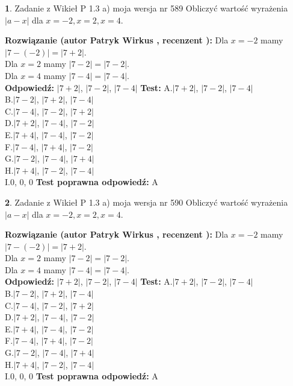 \documentclass[12pt, a4paper]{article}
\theoremstyle{definition} %
\newtheorem{zad}{}
\newcommand{\zadStart}[1]{\begin{zad}#1\newline}
\newcommand{\zadStop}{\end{zad}}
\newcommand{\rozwStart}[2]{\noindent \textbf{Rozwiązanie (autor #1 , recenzent #2): }\newline}
\newcommand{\rozwStop}{\newline}
\newcommand{\odpStart}{\noindent \textbf{Odpowiedź:}\newline}
\newcommand{\odpStop}{\newline}
\newcommand{\testStart}{\noindent \textbf{Test:}\newline}
\newcommand{\testStop}{\newline}
\newcommand{\kluczStart}{\noindent \textbf{Test poprawna odpowiedź:}\newline}
\newcommand{\kluczStop}{\newline}
\begin{document}
\zadStart{Zadanie z Wikieł P 1.3 a) moja wersja nr 589}
Obliczyć wartość wyrażenia $|a - x|$ dla $x=-2,x=2,x=4$.
\zadStop
\rozwStart{Patryk Wirkus}{}
Dla $x = -2$ mamy $|7 - (-2)| = |7 + 2|$.\\
Dla $x = 2$ mamy $|7 - 2| = |7 - 2|$.\\
Dla $x = 4$ mamy $|7 - 4| = |7 - 4|$.\\
\rozwStop
\odpStart
$|7 + 2|$, $|7 - 2|$, $|7 - 4|$
\odpStop
\testStart
A.$|7 + 2|$, $|7 - 2|$, $|7 - 4|$\\
B.$|7 - 2|$, $|7 + 2|$, $|7 - 4|$\\
C.$|7 - 4|$, $|7 - 2|$, $|7 + 2|$\\
D.$|7 + 2|$, $|7 - 4|$, $|7 - 2|$\\
E.$|7 + 4|$, $|7 - 4|$, $|7 - 2|$\\
F.$|7 - 4|$, $|7 + 4|$, $|7 - 2|$\\
G.$|7 - 2|$, $|7 - 4|$, $|7 + 4|$\\
H.$|7 + 4|$, $|7 - 2|$, $|7 - 4|$\\
I.$0$, $0$, $0$
\testStop
\kluczStart
A
\kluczStop



\zadStart{Zadanie z Wikieł P 1.3 a) moja wersja nr 590}
Obliczyć wartość wyrażenia $|a - x|$ dla $x=-2,x=2,x=4$.
\zadStop
\rozwStart{Patryk Wirkus}{}
Dla $x = -2$ mamy $|7 - (-2)| = |7 + 2|$.\\
Dla $x = 2$ mamy $|7 - 2| = |7 - 2|$.\\
Dla $x = 4$ mamy $|7 - 4| = |7 - 4|$.\\
\rozwStop
\odpStart
$|7 + 2|$, $|7 - 2|$, $|7 - 4|$
\odpStop
\testStart
A.$|7 + 2|$, $|7 - 2|$, $|7 - 4|$\\
B.$|7 - 2|$, $|7 + 2|$, $|7 - 4|$\\
C.$|7 - 4|$, $|7 - 2|$, $|7 + 2|$\\
D.$|7 + 2|$, $|7 - 4|$, $|7 - 2|$\\
E.$|7 + 4|$, $|7 - 4|$, $|7 - 2|$\\
F.$|7 - 4|$, $|7 + 4|$, $|7 - 2|$\\
G.$|7 - 2|$, $|7 - 4|$, $|7 + 4|$\\
H.$|7 + 4|$, $|7 - 2|$, $|7 - 4|$\\
I.$0$, $0$, $0$
\testStop
\kluczStart
A
\kluczStop
\end{document}
